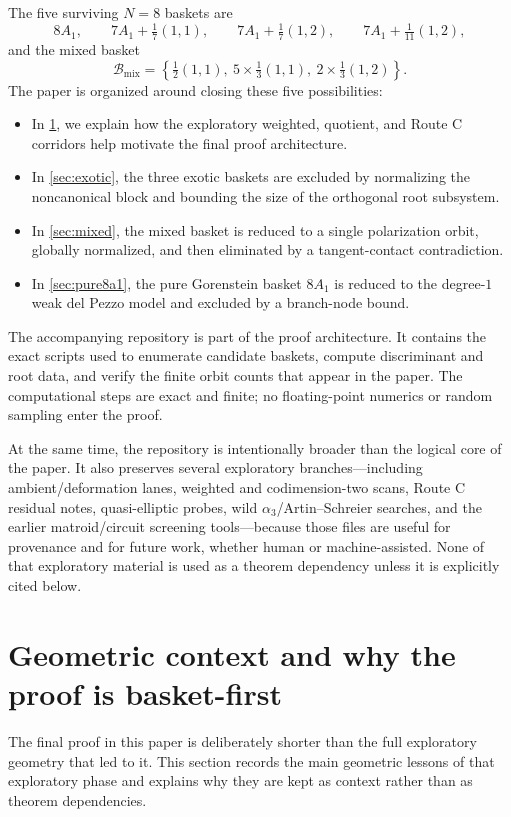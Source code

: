 \documentclass[11pt]{article}
\theoremstyle{definition}
\begin{document}
The five surviving $N=8$ baskets are
\[
8A_1,
\qquad
7A_1+\tfrac17(1,1),
\qquad
7A_1+\tfrac17(1,2),
\qquad
7A_1+\tfrac1{11}(1,2),
\]
and the mixed basket
\[
\mathcal B_{\mathrm{mix}}=\left\{\tfrac12(1,1),\ 5\times\tfrac13(1,1),\ 2\times\tfrac13(1,2)\right\}.
\]
The paper is organized around closing these five possibilities:
\begin{itemize}
\item In \cref{sec:context}, we explain how the exploratory weighted, quotient, and Route C corridors help motivate the final proof architecture.
\item In \cref{sec:exotic}, the three exotic baskets are excluded by normalizing the noncanonical block and bounding the size of the orthogonal root subsystem.
\item In \cref{sec:mixed}, the mixed basket is reduced to a single polarization orbit, globally normalized, and then eliminated by a tangent-contact contradiction.
\item In \cref{sec:pure8a1}, the pure Gorenstein basket $8A_1$ is reduced to the degree-$1$ weak del Pezzo model and excluded by a branch-node bound.
\end{itemize}

The accompanying repository is part of the proof architecture. It contains the exact scripts used to enumerate candidate baskets, compute discriminant and root data, and verify the finite orbit counts that appear in the paper. The computational steps are exact and finite; no floating-point numerics or random sampling enter the proof.

At the same time, the repository is intentionally broader than the logical core of the paper. It also preserves several exploratory branches---including ambient/deformation lanes, weighted and codimension-two scans, Route C residual notes, quasi-elliptic probes, wild $\alpha_3$/Artin--Schreier searches, and the earlier matroid/circuit screening tools---because those files are useful for provenance and for future work, whether human or machine-assisted. None of that exploratory material is used as a theorem dependency unless it is explicitly cited below.

\section{Geometric context and why the proof is basket-first}\label{sec:context}
The final proof in this paper is deliberately shorter than the full exploratory geometry that led to it. This section records the main geometric lessons of that exploratory phase and explains why they are kept as context rather than as theorem dependencies.
\end{document}
